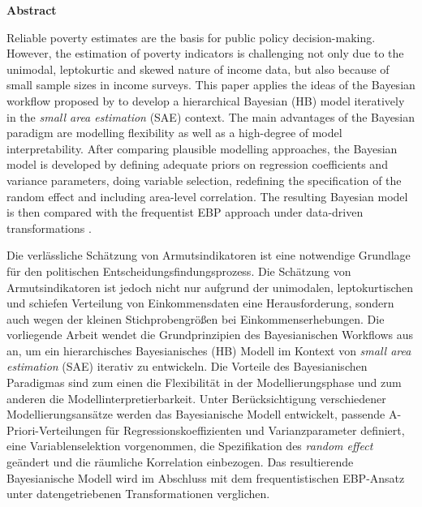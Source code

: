 \begin{center}
    \LARGE
    \textbf{Abstract}
\end{center}
\vspace{2cm}

Reliable poverty estimates are the basis for public policy decision-making.
However, the estimation of poverty indicators is challenging not only due to the unimodal, leptokurtic and skewed nature of income data, but also because of small sample sizes in income surveys.
This paper applies the ideas of the Bayesian workflow proposed by \cite{gelman_bayesian_2020} to develop a hierarchical Bayesian (HB) model iteratively in the \textit{small area estimation} (SAE) context.
The main advantages of the Bayesian paradigm are modelling flexibility as well as a high-degree of model interpretability.
After comparing plausible modelling approaches, the Bayesian model is developed by defining adequate priors on regression coefficients and variance parameters, doing variable selection, redefining the specification of the random effect and including area-level correlation.
The resulting Bayesian model is then compared with the frequentist EBP approach under data-driven transformations \citep{rojas_perilla_data_2020}.

\vspace{3cm}

Die verlässliche Schätzung von Armutsindikatoren ist eine notwendige Grundlage für den politischen Entscheidungsfindungsprozess.
Die Schätzung von Armutsindikatoren ist jedoch nicht nur aufgrund der unimodalen, leptokurtischen und schiefen Verteilung von Einkommensdaten eine Herausforderung, sondern auch wegen der kleinen Stichprobengrößen bei Einkommenserhebungen.
Die vorliegende Arbeit wendet die Grundprinzipien des Bayesianischen Workflows aus \cite{gelman_bayesian_2020} an, um ein hierarchisches Bayesianisches (HB) Modell im Kontext von \textit{small area estimation} (SAE) iterativ zu entwickeln.
Die Vorteile des Bayesianischen Paradigmas sind zum einen die Flexibilität in der Modellierungsphase und zum anderen die Modellinterpretierbarkeit.
Unter Berücksichtigung verschiedener Modellierungsansätze werden das Bayesianische Modell entwickelt, passende A-Priori-Verteilungen für Regressionskoeffizienten und Varianzparameter definiert, eine Variablenselektion vorgenommen, die Spezifikation des \textit{random effect} geändert und die räumliche Korrelation einbezogen.
Das resultierende Bayesianische Modell wird im Abschluss mit dem frequentistischen EBP-Ansatz unter datengetriebenen Transformationen \citep{rojas_perilla_data_2020} verglichen.
